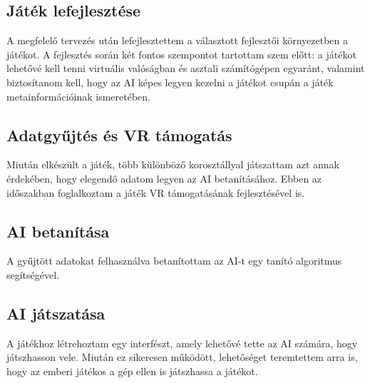 \subsection{Játék lefejlesztése}
A megfelelő tervezés után lefejlesztettem a választott fejlesztői környezetben a játékot. A fejlesztés során két fontos szempontot tartottam szem előtt: a játékot lehetővé kell tenni virtuális valóságban és asztali számítógépen egyaránt, valamint biztosítanom kell, hogy az AI képes legyen kezelni a játékot csupán a játék metainformációinak ismeretében.

\subsection{Adatgyűjtés és VR támogatás}
Miután elkészült a játék, több különböző korosztállyal játszattam azt annak érdekében, hogy elegendő adatom legyen az AI betanításához. Ebben az időszakban foglalkoztam a játék VR támogatásának fejlesztésével is.

\subsection{AI betanítása}
A gyűjtött adatokat felhasználva betanítottam az AI-t egy tanító algoritmus segítségével.

\subsection{AI játszatása}
A játékhoz létrehoztam egy interfészt, amely lehetővé tette az AI számára, hogy játszhasson vele. Miután ez sikeresen működött, lehetőséget teremtettem arra is, hogy az emberi játékos a gép ellen is játszhassa a játékot.
